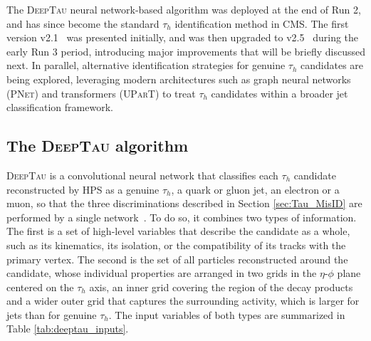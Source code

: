 The \textsc{DeepTau} neural network-based algorithm was deployed at the end of Run 2, and has since become the standard $\tau_h$ identification method in CMS. The first version v2.1~\cite{CMS-TAU-20-001} was presented initially, and was then upgraded to v2.5~\cite{CMS-TAU-24-001} during the early Run 3 period, introducing major improvements that will be briefly discussed next. In parallel, alternative identification strategies for genuine $\tau_h$ candidates are being explored, leveraging modern architectures such as graph neural networks (\textsc{PNet}) and transformers (\textsc{UParT}) to treat $\tau_h$ candidates within a broader jet classification framework.



\subsection{The \textsc{DeepTau} algorithm}
\label{subsec:DeepTau}
%
\textsc{DeepTau} is a convolutional neural network that classifies each $\tau_h$ candidate reconstructed by HPS as a genuine $\tau_h$, a quark or gluon jet, an electron or a muon, so that the three discriminations described in Section \ref{sec:Tau_MisID} are performed by a single network~\cite{CMS-TAU-20-001,CMS-TAU-24-001}. To do so, it combines two types of information. The first is a set of high-level variables that describe the candidate as a whole, such as its kinematics, its isolation, or the compatibility of its tracks with the primary vertex. The second is the set of all particles reconstructed around the candidate, whose individual properties are arranged in two grids in the $\eta$-$\phi$ plane centered on the $\tau_h$ axis, an inner grid covering the region of the decay products and a wider outer grid that captures the surrounding activity, which is larger for jets than for genuine $\tau_h$. The input variables of both types are summarized in Table \ref{tab:deeptau_inputs}.
%
